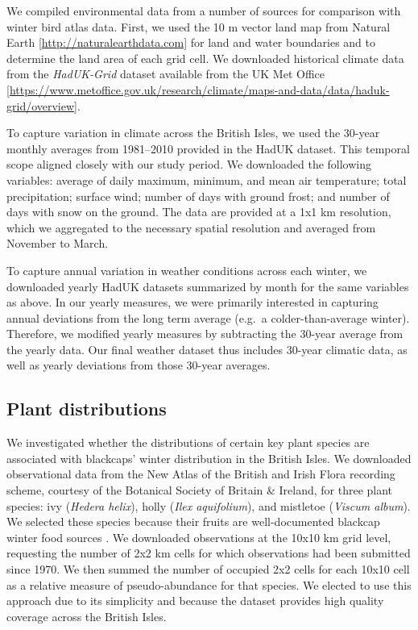 \documentclass[a4paper, nobind]{templates/ociamthesis}
\begin{document}
We compiled environmental data from a number of sources for comparison with winter bird atlas data. First, we used the 10 m vector land map from Natural Earth {[}\url{http://naturalearthdata.com}{]} for land and water boundaries and to determine the land area of each grid cell. We downloaded historical climate data from the \emph{HadUK-Grid} dataset available from the UK Met Office {[}\url{https://www.metoffice.gov.uk/research/climate/maps-and-data/data/haduk-grid/overview}{]}.

To capture variation in climate across the British Isles, we used the 30-year monthly averages from 1981--2010 provided in the HadUK dataset. This temporal scope aligned closely with our study period. We downloaded the following variables: average of daily maximum, minimum, and mean air temperature; total precipitation; surface wind; number of days with ground frost; and number of days with snow on the ground. The data are provided at a 1x1 km resolution, which we aggregated to the necessary spatial resolution and averaged from November to March.

To capture annual variation in weather conditions across each winter, we downloaded yearly HadUK datasets summarized by month for the same variables as above. In our yearly measures, we were primarily interested in capturing annual deviations from the long term average (e.g.~a colder-than-average winter). Therefore, we modified yearly measures by subtracting the 30-year average from the yearly data. Our final weather dataset thus includes 30-year climatic data, as well as yearly deviations from those 30-year averages.

\hypertarget{plant-distributions}{%
\subsection{Plant distributions}\label{plant-distributions}}

We investigated whether the distributions of certain key plant species are associated with blackcaps' winter distribution in the British Isles. We downloaded observational data from the New Atlas of the British and Irish Flora recording scheme, courtesy of the Botanical Society of Britain \& Ireland, for three plant species:
ivy (\emph{Hedera helix}),
holly (\emph{Ilex aquifolium}), and
mistletoe (\emph{Viscum album}). We selected these species because their fruits are well-documented blackcap winter food sources \autocite{snowBirdsBerries2010,hardyWinterFoodsBlackcaps1978,leachWinteringBlackcapsBritain1981}. We downloaded observations at the 10x10 km grid level, requesting the number of 2x2 km cells for which observations had been submitted since 1970. We then summed the number of occupied 2x2 cells for each 10x10 cell as a relative measure of pseudo-abundance for that species. We elected to use this approach due to its simplicity and because the dataset provides high quality coverage across the British Isles.
\end{document}

